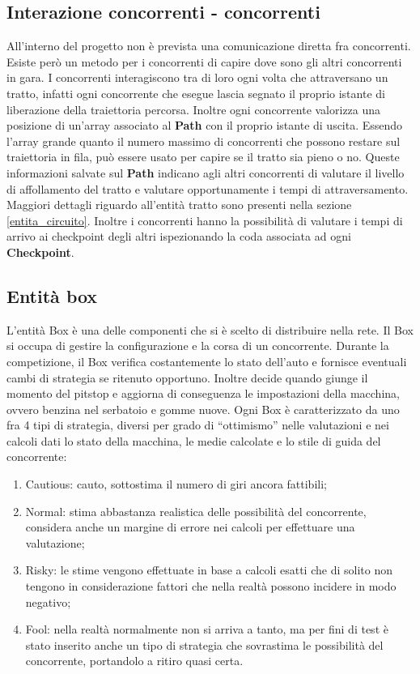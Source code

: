 \subsection{Interazione concorrenti - concorrenti}
All'interno del progetto non è prevista una comunicazione diretta fra
concorrenti. Esiste però un metodo per i concorrenti di capire dove sono gli
altri concorrenti in gara. I concorrenti interagiscono tra di loro ogni volta
che attraversano un tratto, infatti ogni concorrente che esegue lascia segnato
il proprio istante di liberazione della traiettoria percorsa. 
Inoltre ogni concorrente valorizza una posizione di un'array associato al \textbf{Path}
con il proprio istante di uscita. Essendo l'array grande quanto il numero massimo di concorrenti
che possono restare sul traiettoria in fila, può essere usato per capire se il tratto sia pieno o no.
Queste informazioni salvate sul \textbf{Path}
indicano agli altri concorrenti di valutare il livello di affollamento del tratto e valutare
opportunamente i tempi di attraversamento. Maggiori dettagli riguardo all'entità tratto sono presenti nella sezione
\ref{entita_circuito}. Inoltre i concorrenti hanno la possibilità di valutare i tempi di arrivo ai checkpoint degli altri
ispezionando la coda associata ad ogni \textbf{Checkpoint}.
\subsection{Entità box}
L'entità Box è una delle componenti che si è scelto di distribuire nella rete.
Il Box si occupa di gestire la configurazione e la corsa di un concorrente.
Durante la competizione, il Box verifica costantemente lo stato dell'auto e
fornisce eventuali cambi di strategia se ritenuto opportuno. Inoltre decide
quando giunge il momento del pitstop e aggiorna di conseguenza le impostazioni
della macchina, ovvero benzina nel serbatoio e gomme nuove. Ogni Box è
caratterizzato da uno fra 4 tipi di strategia, diversi per grado di
``ottimismo'' nelle valutazioni e nei calcoli dati lo stato della macchina, le
medie calcolate e lo stile di guida del concorrente:
\begin{enumerate}
\item Cautious: cauto, sottostima il numero di giri ancora fattibili;
\item Normal: stima abbastanza realistica delle possibilità del concorrente,
considera anche un margine di errore nei calcoli per effettuare una valutazione;
\item Risky: le stime vengono effettuate in base a calcoli esatti che di solito
non tengono in considerazione fattori che nella realtà possono incidere in modo
negativo;
\item Fool: nella realtà normalmente non si arriva a tanto, ma per fini di test
è stato inserito anche un tipo di strategia che sovrastima le possibilità del
concorrente, portandolo a ritiro quasi certa.
\end{enumerate}
